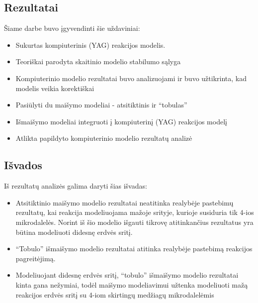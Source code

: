 
\subsection*{Rezultatai}

Šiame darbe buvo įgyvendinti šie uždaviniai:

\begin{itemize}
    \item Sukurtas kompiuterinis (YAG) reakcijos modelis. 
    \item Teoriškai parodyta skaitinio modelio stabilumo sąlyga
    \item Kompiuterinio modelio rezultatai buvo analizuojami ir buvo užtikrinta, kad modelis veikia korektiškai
    \item Pasiūlyti du maišymo modeliai - atsitiktinis ir \enquote{tobulas}
    \item Išmaišymo modeliai integruoti į kompiuterinį (YAG) reakcijos modelį
    \item Atlikta papildyto kompiuterinio modelio rezultatų analizė
\end{itemize}

\subsection*{Išvados}

Iš rezultatų analizės galima daryti šias išvadas:

\begin{itemize}
    \item Atsitiktinio maišymo modelio rezultatai neatitinka realybėje pastebimų rezultatų, kai reakcija modeliuojama mažoje srityje, kurioje susiduria tik 4-ios mikrodalelės. Norint iš šio modelio išgauti tikrovę atitinkančius rezultatus yra būtina modeliuoti didesnę erdvės sritį.

    \item \enquote{Tobulo} išmaišymo modelio rezultatai atitinka realybėje pastebimą reakcijos pagreitėjimą.
    
    \item Modeliuojant didesnę erdvės sritį, \enquote{tobulo} išmaišymo modelio rezultatai kinta gana nežymiai, todėl maišymo modeliavimui užtenka modeliuoti mažą reakcijos erdvės sritį su 4-iom skirtingų medžiagų mikrodalelėmis

\end{itemize}